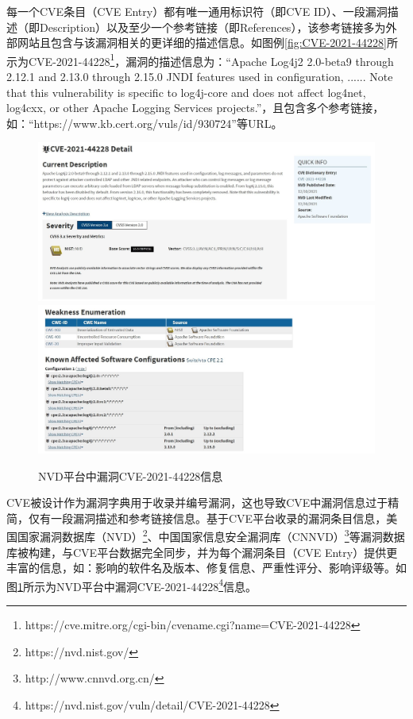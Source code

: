 每一个CVE条目（CVE Entry）都有唯一通用标识符（即CVE ID）、一段漏洞描述（即Description）以及至少一个参考链接（即References），该参考链接多为外部网站且包含与该漏洞相关的更详细的描述信息。如图例\ref{fig:CVE-2021-44228}所示为CVE-2021-44228\footnote{https://cve.mitre.org/cgi-bin/cvename.cgi?name=CVE-2021-44228}，漏洞的描述信息为：“Apache Log4j2 2.0-beta9 through 2.12.1 and 2.13.0 through 2.15.0 JNDI features used in configuration, ...... Note that this vulnerability is specific to log4j-core and does not affect log4net, log4cxx, or other Apache Logging Services projects.”，且包含多个参考链接，如：“https://www.kb.cert.org/vuls/id/930724”等URL。

\begin{figure}[h]
    \centering
    \includegraphics[width=1.0\textwidth]{fig/NVD-2021-44228}
    \includegraphics[width=1.0\textwidth]{fig/NVD-2021-44228-2}
    \caption{NVD平台中漏洞CVE-2021-44228信息}
    \label{fig:NVD-2021-44228}
\end{figure}

CVE被设计作为漏洞字典用于收录并编号漏洞，这也导致CVE中漏洞信息过于精简，仅有一段漏洞描述和参考链接信息。基于CVE平台收录的漏洞条目信息，美国国家漏洞数据库（NVD）\footnote{https://nvd.nist.gov/}、中国国家信息安全漏洞库（CNNVD）\footnote{http://www.cnnvd.org.cn/}等漏洞数据库被构建，与CVE平台数据完全同步，并为每个漏洞条目（CVE Entry）提供更丰富的信息，如：影响的软件名及版本、修复信息、严重性评分、影响评级等。如图\ref{fig:NVD-2021-44228}所示为NVD平台中漏洞CVE-2021-44228\footnote{https://nvd.nist.gov/vuln/detail/CVE-2021-44228}信息。



